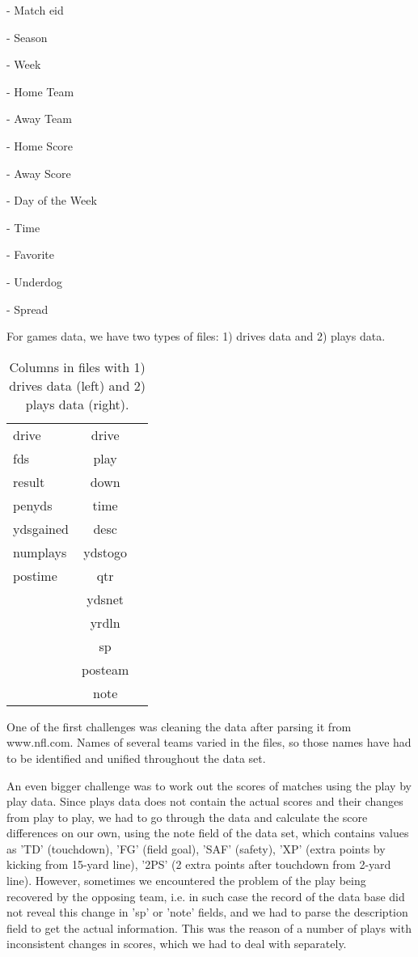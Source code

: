 \documentclass[runningheads]{llncs}
\begin{document}
- Match eid	

- Season

- Week	

- Home Team	

- Away Team

- Home Score	

- Away Score	

- Day of the Week

- Time

- Favorite	

- Underdog	

- Spread

For games data, we have two types of files: 1) drives data and 2) plays data.

\begin{table*}[htb]
  \centering
  \setlength{\tabcolsep}{36pt}
  \begin{tabular}{lcr}
    drive &      drive \\
    fds &        play \\
    result &     down \\
    penyds &    time \\
    ydsgained &  desc \\
    numplays &  ydstogo \\
    postime &   qtr \\
     & ydsnet \\ 
     & yrdln \\
     & sp \\
     & posteam \\
     & note \\
  \end{tabular}
  \caption{Columns in files with 1) drives data (left) and 2) plays data (right).}
  \label{tab:1}
\end{table*}
One of the first challenges was cleaning the data after parsing it from www.nfl.com. Names of several teams varied in the files, so those names have had to be identified and unified throughout the data set. 

An even bigger challenge was to work out the scores of matches using the play by play data. Since plays data does not contain the actual scores and their changes from play to play, we had to go through the data and calculate the score differences on our own, using the note field of the data set, which contains values as 'TD' (touchdown), 'FG' (field goal), 'SAF' (safety), 'XP' (extra points by kicking from 15-yard line), '2PS' (2 extra points after touchdown from 2-yard line). However, sometimes we encountered the problem of the play being recovered by the opposing team, i.e. in such case the record of the data base did not reveal this change in 'sp' or 'note' fields, and we had to parse the description field to get the actual information. This was the reason of a number of plays with inconsistent changes in scores, which we had to deal with separately.
\end{document}
